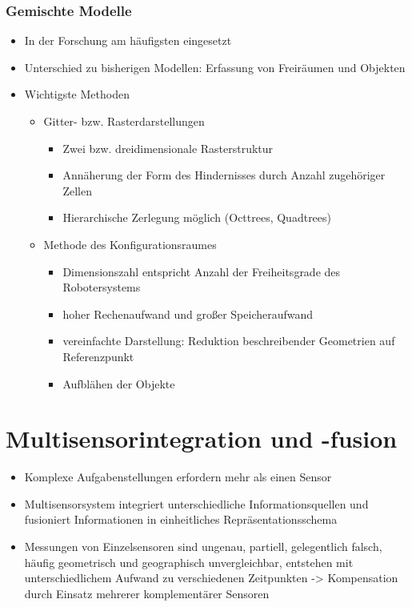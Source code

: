 \documentclass[paper=a4, fontsize=11pt]{scrartcl} %
\numberwithin{equation}{section} %
\numberwithin{figure}{section} %
\numberwithin{table}{section} %
\begin{document}
\subsubsection{Gemischte Modelle}
\begin{itemize}
\item In der Forschung am häufigsten eingesetzt
\item Unterschied zu bisherigen Modellen: Erfassung von Freiräumen und Objekten
\item Wichtigste Methoden
\begin{itemize}
\item Gitter- bzw. Rasterdarstellungen
\begin{itemize}
\item Zwei bzw. dreidimensionale Rasterstruktur
\item Annäherung der Form des Hindernisses durch Anzahl zugehöriger Zellen
\item Hierarchische Zerlegung möglich (Octtrees, Quadtrees)
\end{itemize}
\item Methode des Konfigurationsraumes
\begin{itemize}
\item Dimensionszahl entspricht Anzahl der Freiheitsgrade des Robotersystems
\item hoher Rechenaufwand und großer Speicheraufwand
\item vereinfachte Darstellung: Reduktion beschreibender Geometrien auf Referenzpunkt
\item Aufblähen der Objekte
\end{itemize}
\end{itemize}
\end{itemize}

\section{Multisensorintegration und -fusion}

\begin{itemize}
\item Komplexe Aufgabenstellungen erfordern mehr als einen Sensor
\item Multisensorsystem integriert unterschiedliche Informationsquellen und fusioniert Informationen in einheitliches Repräsentationsschema
\item Messungen von Einzelsensoren sind ungenau, partiell, gelegentlich falsch, häufig geometrisch und geographisch unvergleichbar, entstehen mit unterschiedlichem Aufwand zu verschiedenen Zeitpunkten -> Kompensation durch Einsatz mehrerer komplementärer Sensoren
\end{itemize}
\end{document}
